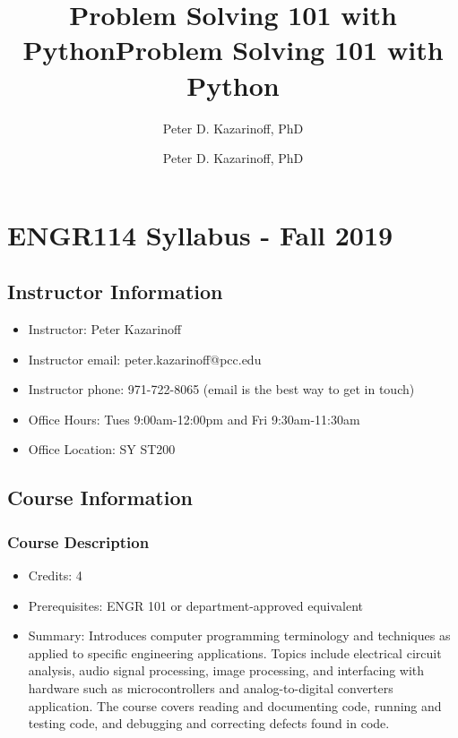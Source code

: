 \documentclass[11pt]{article}
\title{Problem Solving 101 with Python}
\author{Peter D. Kazarinoff, PhD}
\date{}
\title{Problem Solving 101 with Python}
\author{Peter D. Kazarinoff, PhD}
\date{}
\providecommand{\tightlist}{%
      \setlength{\itemsep}{0pt}\setlength{\parskip}{0pt}}
\begin{document}
    
    
    

    
    

    
    \hypertarget{engr114-syllabus---fall-2019}{%
\section{ENGR114 Syllabus - Fall
2019}\label{engr114-syllabus---fall-2019}}

    \hypertarget{instructor-information}{%
\subsection{Instructor Information}\label{instructor-information}}

\begin{itemize}
\tightlist
\item
  Instructor: Peter Kazarinoff
\item
  Instructor email: peter.kazarinoff@pcc.edu
\item
  Instructor phone: 971-722-8065 (email is the best way to get in touch)
\item
  Office Hours: Tues 9:00am-12:00pm and Fri 9:30am-11:30am
\item
  Office Location: SY ST200
\end{itemize}

    \hypertarget{course-information}{%
\subsection{Course Information}\label{course-information}}

\hypertarget{course-description}{%
\subsubsection{Course Description}\label{course-description}}

\begin{itemize}
\tightlist
\item
  Credits: 4
\item
  Prerequisites: ENGR 101 or department-approved equivalent
\item
  Summary: Introduces computer programming terminology and techniques as
  applied to specific engineering applications. Topics include
  electrical circuit analysis, audio signal processing, image
  processing, and interfacing with hardware such as microcontrollers and
  analog-to-digital converters application. The course covers reading
  and documenting code, running and testing code, and debugging and
  correcting defects found in code.
\end{itemize}
\end{document}
